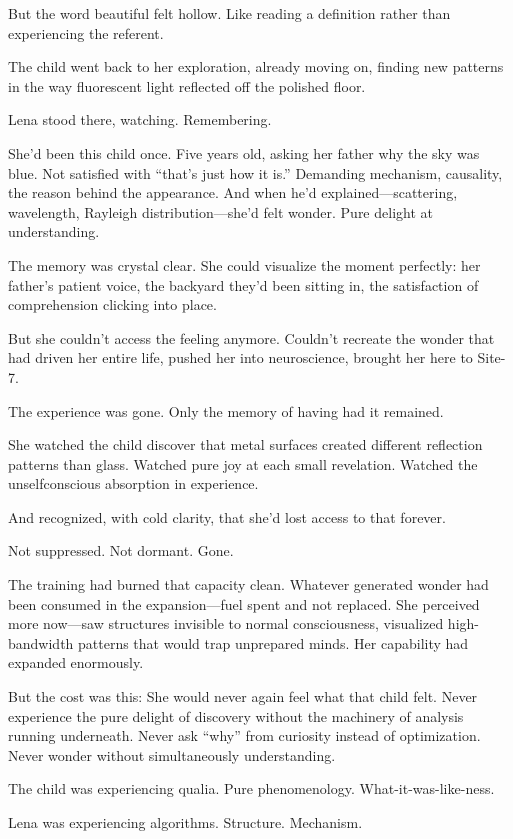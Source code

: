 But the word beautiful felt hollow. Like reading a definition rather than experiencing the referent.

The child went back to her exploration, already moving on, finding new patterns in the way fluorescent light reflected off the polished floor.

Lena stood there, watching. Remembering.

She'd been this child once. Five years old, asking her father why the sky was blue. Not satisfied with ``that's just how it is.'' Demanding mechanism, causality, the reason behind the appearance. And when he'd explained—scattering, wavelength, Rayleigh distribution—she'd felt wonder. Pure delight at understanding.

The memory was crystal clear. She could visualize the moment perfectly: her father's patient voice, the backyard they'd been sitting in, the satisfaction of comprehension clicking into place.

But she couldn't access the feeling anymore. Couldn't recreate the wonder that had driven her entire life, pushed her into neuroscience, brought her here to Site-7.

The experience was gone. Only the memory of having had it remained.

She watched the child discover that metal surfaces created different reflection patterns than glass. Watched pure joy at each small revelation. Watched the unselfconscious absorption in experience.

And recognized, with cold clarity, that she'd lost access to that forever.

Not suppressed. Not dormant. Gone.

The training had burned that capacity clean. Whatever generated wonder had been consumed in the expansion---fuel spent and not replaced. She perceived more now—saw structures invisible to normal consciousness, visualized high-bandwidth patterns that would trap unprepared minds. Her capability had expanded enormously.

But the cost was this: She would never again feel what that child felt. Never experience the pure delight of discovery without the machinery of analysis running underneath. Never ask ``why'' from curiosity instead of optimization. Never wonder without simultaneously understanding.

The child was experiencing qualia. Pure phenomenology. What-it-was-like-ness.

Lena was experiencing algorithms. Structure. Mechanism.

